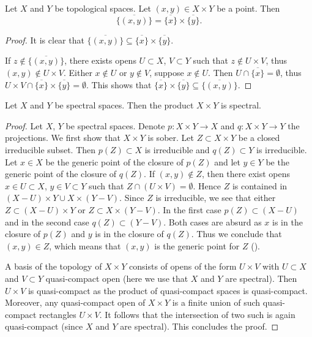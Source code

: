 \begin{lemma}
  \label{thm:closure-product}
  Let $X$ and $Y$ be topological spaces. Let $(x, y) \in X \times Y$ be a point. Then 
  \[\overline{\{(x, y)\}} = \overline{\{x\}} \times \overline{\{y\}}.\]
\end{lemma}

\begin{proof}
  It is clear that \(\overline{\{(x, y)\}} \subseteq \overline{\{x\}} \times \overline{\{y\}}\).

  If \(z \notin \overline{\{(x, y)\}}\), there exists opens \(U \subset X\), \(V \subset Y\) such that \(z \notin U \times V\), thus \((x, y) \notin U \times V\). Either \(x \notin U\) or \(y \notin V\), suppose \(x \notin U\). Then \(U \cap \overline{\{x\}} = \emptyset\), thus \(U \times V \cap \overline{\{x\}} \times \overline{\{y\}}  = \emptyset\). This shows that \(\overline{\{x\}} \times \overline{\{y\}} \subseteq \overline{\{(x, y)\}}\).
\end{proof}

\begin{lemma}
  \label{thm:spectral-product}
  Let $X$ and $Y$ be spectral spaces. Then the product $X \times Y$ is spectral.
\end{lemma}

\begin{proof}
  Let $X$, $Y$ be spectral spaces. Denote $p : X \times Y \to X$ and $q : X \times Y \to Y$ the projections. We first show that \(X \times Y\) is sober. Let $Z \subset X \times Y$ be a closed irreducible subset. Then $p(Z) \subset X$ is irreducible and $q(Z) \subset Y$ is irreducible. Let $x \in X$ be the generic point of the closure of $p(Z)$ and let $y \in Y$ be the generic point of the closure of $q(Z)$. If $(x, y) \notin Z$, then there exist opens $x \in U \subset X$, $y \in V \subset Y$ such that $Z \cap (U \times V) = \emptyset$. Hence $Z$ is contained in $(X - U) \times Y \cup X \times (Y - V)$. Since $Z$ is irreducible, we see that either $Z \subset (X - U) \times Y$ or $Z \subset X \times (Y - V)$. In the first case $p(Z) \subset (X - U)$ and in the second case $q(Z) \subset (Y - V)$. Both cases are absurd as $x$ is in the closure of $p(Z)$ and $y$ is in the closure of $q(Z)$. Thus we conclude that $(x, y) \in Z$, which means that $(x, y)$ is the generic point for $Z$ ().

  A basis of the topology of $X \times Y$ consists of opens of the form $U \times V$ with $U \subset X$ and $V \subset Y$ quasi-compact open (here we use that $X$ and $Y$ are spectral). Then $U \times V$ is quasi-compact as the product of quasi-compact spaces is quasi-compact. Moreover, any quasi-compact open of $X \times Y$ is a finite union of such quasi-compact rectangles $U \times V$. It follows that the intersection of two such is again quasi-compact (since $X$ and $Y$ are spectral). This concludes the proof.
\end{proof}

